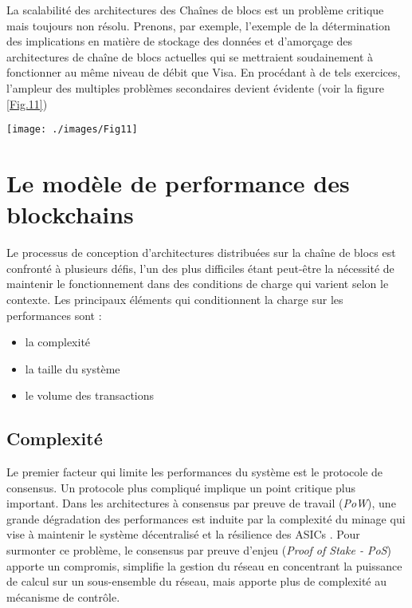 \documentclass[journal]{IEEEtran}
\begin{document}
La scalabilité des architectures des Chaînes de blocs est un problème critique mais toujours non résolu. Prenons, par exemple, l'exemple de la détermination des implications en matière de stockage des données et d’amorçage des architectures de chaîne  de blocs actuelles qui se mettraient soudainement à fonctionner au même niveau de débit que Visa. En procédant à de tels exercices, l'ampleur des multiples problèmes secondaires devient évidente (voir la figure \ref{Fig.11})

\begin{figure*}[h]
         \centering
	\texttt{[image: ./images/Fig11]} %
	\caption{Estimation du stockage - Architectures distribuées validées fonctionnant à un débit (TPS) moyen correspondant à celui de VISA } %
	\label{Fig.11} %
\end{figure*}


\section{Le modèle de performance des blockchains}
Le processus de conception d'architectures distribuées sur la chaîne de blocs est confronté à plusieurs défis, l'un des plus difficiles étant peut-être la nécessité de maintenir le fonctionnement dans des conditions de charge qui varient selon le contexte. Les principaux éléments qui conditionnent la charge sur les performances sont :

\begin{itemize}
  \item la complexité
  \item  la taille du système
  \item  le volume des transactions
\end{itemize}

\subsection{Complexité}
Le premier facteur qui limite les performances du système est le protocole de consensus. Un protocole plus compliqué implique un point critique plus important. Dans les architectures à consensus par preuve de travail (\textit{PoW}), une grande dégradation des performances est induite par la complexité du minage qui vise à maintenir le système décentralisé et la résilience des ASICs \cite{50}. 
Pour surmonter ce problème, le consensus par preuve d'enjeu (\textit{Proof of Stake - PoS}) apporte un compromis, simplifie la gestion du réseau en concentrant la puissance de calcul sur un sous-ensemble du réseau, mais apporte plus de complexité au mécanisme de contrôle.
\end{document}
